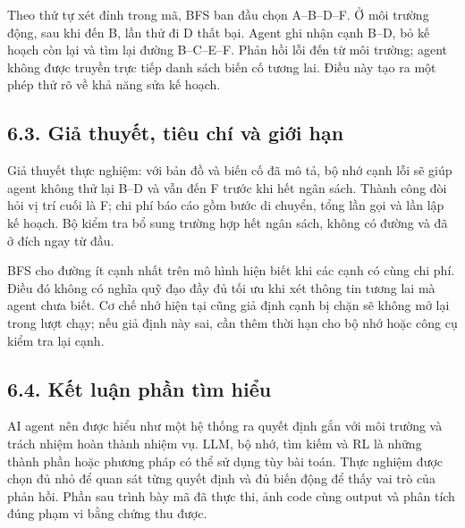 \documentclass[11pt,a4paper]{article}
\begin{document}
\begin{center}
\end{center}

Theo thứ tự xét đỉnh trong mã, BFS ban đầu chọn A--B--D--F. Ở môi trường động, sau khi
đến B, lần thử đi D thất bại. Agent ghi nhận cạnh B--D, bỏ kế hoạch còn lại và tìm lại
đường B--C--E--F. Phản hồi lỗi đến từ môi trường; agent không được truyền trực tiếp
danh sách biến cố tương lai. Điều này tạo ra một phép thử rõ về khả năng sửa kế hoạch.

\subsection{6.3. Giả thuyết, tiêu chí và giới hạn}
Giả thuyết thực nghiệm: với bản đồ và biến cố đã mô tả, bộ nhớ cạnh lỗi sẽ giúp agent
không thử lại B--D và vẫn đến F trước khi hết ngân sách. Thành công đòi hỏi vị trí cuối
là F; chi phí báo cáo gồm bước di chuyển, tổng lần gọi và lần lập kế hoạch. Bộ kiểm tra
bổ sung trường hợp hết ngân sách, không có đường và đã ở đích ngay từ đầu.

BFS cho đường ít cạnh nhất trên mô hình hiện biết khi các cạnh có cùng chi phí.
Điều đó không có nghĩa quỹ đạo đầy đủ tối ưu khi xét thông tin tương lai mà agent chưa
biết. Cơ chế nhớ hiện tại cũng giả định cạnh bị chặn sẽ không mở lại trong lượt chạy;
nếu giả định này sai, cần thêm thời hạn cho bộ nhớ hoặc công cụ kiểm tra lại cạnh.

\subsection{6.4. Kết luận phần tìm hiểu}
AI agent nên được hiểu như một hệ thống ra quyết định gắn với môi trường và trách
nhiệm hoàn thành nhiệm vụ. LLM, bộ nhớ, tìm kiếm và RL là những thành phần hoặc phương
pháp có thể sử dụng tùy bài toán. Thực nghiệm được chọn đủ nhỏ để quan sát từng quyết
định và đủ biến động để thấy vai trò của phản hồi. Phần sau trình bày mã đã thực thi,
ảnh code cùng output và phân tích đúng phạm vi bằng chứng thu được.
\end{document}
